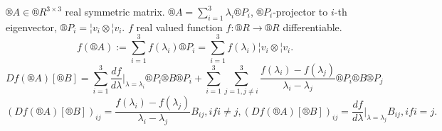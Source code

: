 \documentclass[12pt]{article}					%
\begin{document}
\begin{veta}
	$®A \in ®R^{3 \times 3}$ real symmetric matrix. $®A = \sum_{i=1}^3 \lambda_i ®P_i$, $®P_i$-projector to $i$-th eigenvector, $®P_i = ¦v_i \otimes ¦v_i$. $f$ real valued function $f: ®R \rightarrow ®R$ differentiable.
	$$ f(®A) := \sum_{i=1}^3 f(\lambda_i) ®P_i = \sum_{i=1}^3 f(\lambda_i) ¦v_i \otimes ¦v_i. $$
	$$ Df(®A)[®B] = \sum_{i=1}^3 \frac{df}{d\lambda}|_{\lambda = \lambda_i} ®P_i ®B ®P_i + \sum_{i=1}^3 \sum_{j=1, j≠i}^3 \frac{f(\lambda_i) - f(\lambda_j)}{\lambda_i - \lambda_j} ®P_i ®B ®P_j $$
	$$ (Df(®A)[®B])_{ij} = \frac{f(\lambda_i) - f(\lambda_j)}{\lambda_i - \lambda_j} B_{ij}, if i ≠ j, (Df(®A)[®B])_{ij} = \frac{df}{d\lambda}|_{\lambda = \lambda_j} B_{ij}, if i=j. $$

\end{veta}
\end{document}
